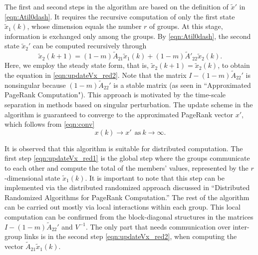 \documentclass[11pt,draftcls,onecolumn]{IEEEtran}
\begin{document}
\medskip
The first and second steps in the algorithm are based on the
definition of $\widetilde{x}'$ in \eqref{eqn:Atil0dash}.
It requires the recursive computation of only the first state 
$\widetilde{x}_1(k)$, whose dimension 
equals the number $r$ of groups. At this stage, 
information is exchanged only among the groups.
By \eqref{eqn:Atil0dash}, the second state $\widetilde{x}_2'$ can
be computed recursively through
\[
 \widetilde{x}_2(k+1)
  = (1-m)\widetilde{A}_{21} \widetilde{x}_1(k)
     + (1-m) \widetilde{A}'_{22} \widetilde{x}_2(k).
\]
Here, we employ the steady state form, that is, $\widetilde{x}_2(k+1)=\widetilde{x}_2(k)$, 
to obtain the equation in \eqref{eqn:updateVx_red2}.
Note that the matrix $I - (1-m)\widetilde{A}_{22}'$ is nonsingular
because $(1-m)\widetilde{A}_{22}'$ is a stable matrix (as seen in 
``Approximated PageRank Computation").
This approach is motivated by the time-scale separation in methods based on
singular perturbation.
The update scheme in the algorithm is guaranteed to converge to 
the approximated PageRank vector $x'$, which follows from \eqref{eqn:conv}
\[
  x(k)\rightarrow x'~~\text{as}~k\rightarrow\infty.
\]

It is observed that this algorithm is suitable for distributed computation. 
The first step \eqref{eqn:updateVx_red1} is the global step
where the groups communicate to each other and
compute the total of the members' values, represented by 
the $r$-dimensional state $\widetilde{x}_1(k)$.
It is important to note that this step can be implemented via the 
distributed randomized approach discussed in 
``Distributed Randomized Algorithms for PageRank Computation.''
The rest of the algorithm can be carried out mostly  
via local interactions within each group.
This local computation can be confirmed from the block-diagonal structures in
the matrices $I - (1-m)\widetilde{A}_{22}'$ and $V^{-1}$.
The only part that needs communication over inter-group links
is in the second step \eqref{eqn:updateVx_red2}, when 
computing the vector $\widetilde{A}_{21} \widetilde{x}_1(k)$.
\end{document}
